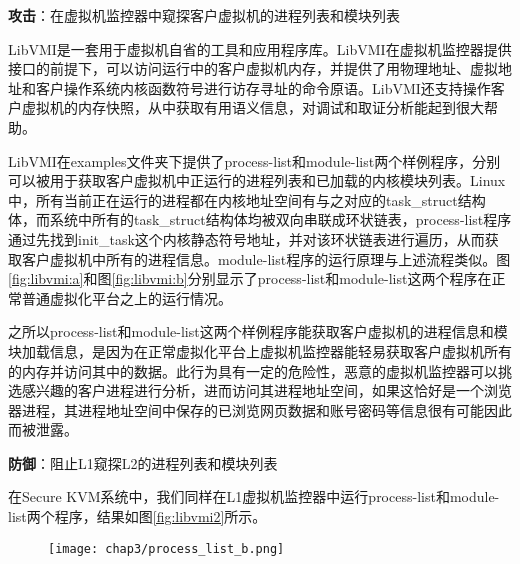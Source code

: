 \noindent
\textbf{攻击\uppercase\expandafter{}}：在虚拟机监控器中窥探客户虚拟机的进程列表和模块列表

LibVMI\cite{payne2012simplifying}是一套用于虚拟机自省的工具和应用程序库。LibVMI在虚拟机监控器提供接口的前提下，可以访问运行中的客户虚拟机内存，并提供了用物理地址、虚拟地址和客户操作系统内核函数符号进行访存寻址的命令原语。LibVMI还支持操作客户虚拟机的内存快照，从中获取有用语义信息，对调试和取证分析能起到很大帮助。

LibVMI在examples文件夹下提供了process-list和module-list两个样例程序，分别可以被用于获取客户虚拟机中正运行的进程列表和已加载的内核模块列表。Linux中，所有当前正在运行的进程都在内核地址空间有与之对应的task\_struct结构体，而系统中所有的task\_struct结构体均被双向串联成环状链表，process-list程序通过先找到init\_task这个内核静态符号地址，并对该环状链表进行遍历，从而获取客户虚拟机中所有的进程信息。module-list程序的运行原理与上述流程类似。图\ref{fig:libvmi:a}和图\ref{fig:libvmi:b}分别显示了process-list和module-list这两个程序在正常普通虚拟化平台之上的运行情况。

\begin{figure}
\centering
{}
\end{figure}

之所以process-list和module-list这两个样例程序能获取客户虚拟机的进程信息和模块加载信息，是因为在正常虚拟化平台上虚拟机监控器能轻易获取客户虚拟机所有的内存并访问其中的数据。此行为具有一定的危险性，恶意的虚拟机监控器可以挑选感兴趣的客户进程进行分析，进而访问其进程地址空间，如果这恰好是一个浏览器进程，其进程地址空间中保存的已浏览网页数据和账号密码等信息很有可能因此而被泄露。

\noindent
\textbf{防御\uppercase\expandafter{}}：阻止L1窥探L2的进程列表和模块列表

在Secure KVM系统中，我们同样在L1虚拟机监控器中运行process-list和module-list两个程序，结果如图\ref{fig:libvmi2}所示。

\begin{figure}[!htbp]
  \centering
  \texttt{[image: chap3/process\_list\_b.png]}
\end{figure}

